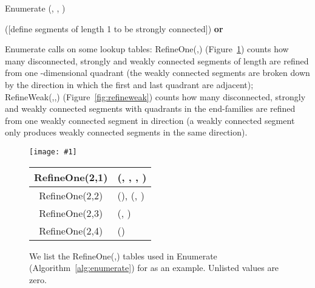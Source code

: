 \documentclass[a4paper,11pt]{article}
\newcommand{\inputtikz}[1]{\texttt{[image: \#1]}}
\newcommand{\figlab}[1]{\label{fig:#1}}
\newcommand{\figref}[1]{Figure~\ref{fig:#1}}
\newcommand{\alglab}[1]{\label{alg:#1}}
\newcommand{\algref}[1]{Algorithm~\ref{alg:#1}}
\begin{document}
\begin{algorithm}
  \caption{Enumerate (, , )
  }\alglab{enumerate}
  \DontPrintSemicolon



  \If (\hfill[define segments of length 1 to be strongly connected]){ {\rm{\bf or}} }{\KwRet{}
  }


  

  

  \lIf {}{
  }\lElse{
  }


  \KwRet{}

\end{algorithm}

Enumerate calls on some lookup tables: RefineOne(,) (\figref{refineone})
counts how many disconnected, strongly and weakly connected segments of length
 are refined from one -dimensional quadrant (the weakly connected
segments are broken down by the direction in which the first and last quadrant
are adjacent); RefineWeak(,,) (\figref{refineweak}) counts how many
disconnected, strongly and weakly connected segments with  quadrants in the
end-families are refined from one weakly connected segment in direction  (a
weakly connected segment only produces weakly connected segments in the same
direction). 

\begin{figure}\centering
  \inputtikz{refineone}

  \null

  \renewcommand{\arraystretch}{1.1}
  \begin{tabular}{|c|l|}\hline
    RefineOne(2,1) &  (, , ,
    )
    \\ \hline
    RefineOne(2,2) &  (),  (,
    )
    \\ \hline
    RefineOne(2,3) &  (, )
    \\ \hline
    RefineOne(2,4) &  ()
    \\ \hline
  \end{tabular}
  \caption{We list the RefineOne(,) tables used in Enumerate
    (\algref{enumerate}) for  as an example.  Unlisted values are zero.}\figlab{refineone}
\end{figure}
\end{document}

